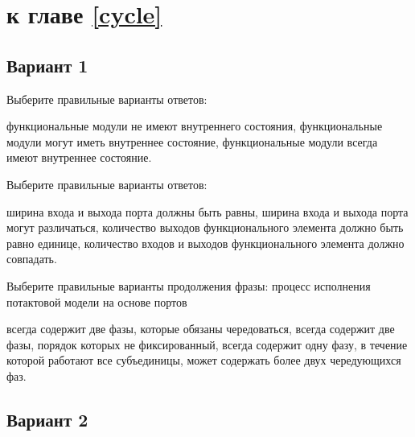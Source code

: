 \section{\Questions к главе \ref{cycle}} %

\subsection*{Вариант 1}

\begin{questions}

\question[3] Выберите правильные варианты ответов:
\begin{choices}
    \correctchoice функциональные модули не имеют внутреннего состояния,
    \choice функциональные модули могут иметь внутреннее состояние,
    \choice функциональные модули всегда имеют внутреннее состояние.
\end{choices}
    
    
\question[3] Выберите правильные варианты ответов:
\begin{choices}
    \correctchoice ширина входа и выхода порта должны быть равны,
    \choice ширина входа и выхода порта могут различаться,
    \choice количество выходов функционального элемента должно быть равно единице,
    \choice количество входов и выходов функционального элемента должно совпадать.
\end{choices}
    
\question[3] Выберите правильные варианты продолжения фразы: процесс исполнения потактовой модели на основе портов 
\begin{choices}
    \correctchoice всегда содержит две фазы, которые обязаны чередоваться,
    \choice всегда содержит две фазы, порядок которых не фиксированный,
    \choice всегда содержит одну фазу, в течение которой работают все субъединицы,
    \choice может содержать более двух чередующихся фаз.
\end{choices}



\end{questions}

\subsection*{Вариант 2}

